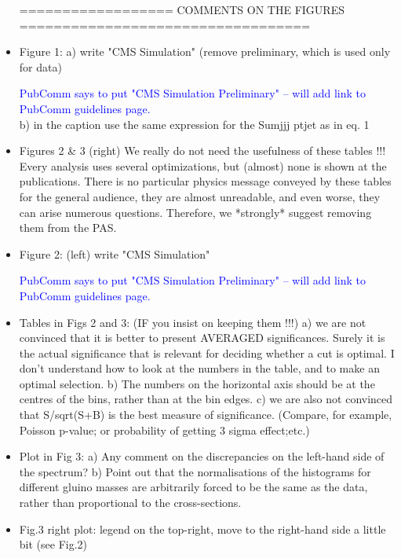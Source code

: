 \documentclass[paper=a4, fontsize=11pt]{scrartcl}
\begin{document}
\begin{itemize}
================== COMMENTS ON THE FIGURES ================================== 


\item Figure 1: 
a) write "CMS Simulation" (remove preliminary, which is used only for data) 

\textcolor{Blue}{PubComm says to put "CMS Simulation Preliminary" -- will add link to PubComm guidelines page.}\\

b) in the caption use the same expression for the Sumjjj ptjet as in eq. 1 


\item Figures 2 \& 3 (right) 
We really do not need the usefulness of these tables !!! Every analysis uses 
several optimizations, but (almost) none is shown at the publications. There 
is no particular physics message conveyed by these tables for the general 
audience, they are almost unreadable, and even worse, they can arise numerous 
questions. Therefore, we *strongly* suggest removing them from the PAS. 


\item Figure 2: 
(left) write "CMS Simulation" 

\textcolor{Blue}{PubComm says to put "CMS Simulation Preliminary" -- will add link to PubComm guidelines page.}\\

\item Tables in Figs 2 and 3: (IF you insist on keeping them !!!) 
a) we are not convinced that it is better to present AVERAGED significances. 
Surely it is the actual significance that is relevant for deciding whether 
a cut is optimal. I don't understand how to look at the numbers in the table, 
and to make an optimal selection. 
b) The numbers on the horizontal axis should be at the centres of the bins, 
rather than at the bin edges. 
c) we are also not convinced that S/sqrt(S+B) is the best measure of 
significance. (Compare, for example, Poisson p-value; or probability of 
getting 3 sigma effect;etc.) 


\item Plot in Fig 3: 
a) Any comment on the discrepancies on the left-hand side of the spectrum? 
b) Point out that the normalisations of the histograms for different gluino 
masses are arbitrarily forced to be the same as the data, rather than 
proportional to the cross-sections. 


\item Fig.3 
right plot: legend on the top-right, move to the right-hand side a little 
bit (see Fig.2) 



\end{itemize}
\end{document}
